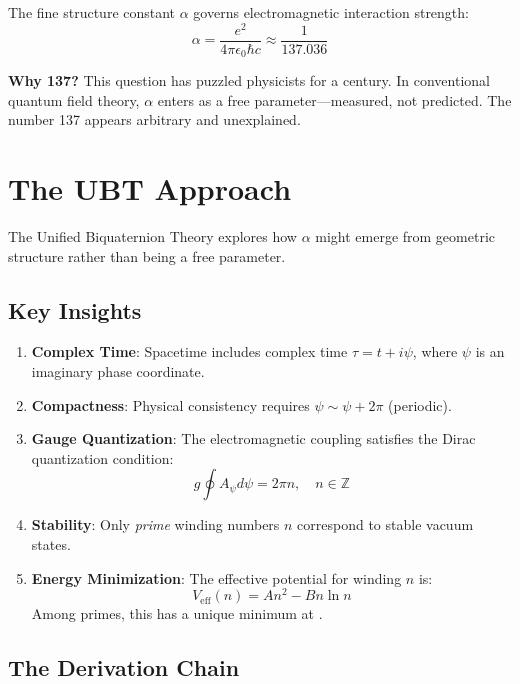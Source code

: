 \documentclass[12pt, a4paper]{article}
\begin{document}
The fine structure constant $\alpha$ governs electromagnetic interaction strength:
\begin{equation}
\alpha = \frac{e^2}{4\pi\epsilon_0\hbar c} \approx \frac{1}{137.036}
\end{equation}

\textbf{Why 137?} This question has puzzled physicists for a century. In conventional quantum field theory, $\alpha$ enters as a free parameter—measured, not predicted. The number 137 appears arbitrary and unexplained.

\section{The UBT Approach}

The Unified Biquaternion Theory explores how $\alpha$ might emerge from geometric structure rather than being a free parameter.

\subsection{Key Insights}

\begin{enumerate}
\item \textbf{Complex Time}: Spacetime includes complex time $\tau = t + i\psi$, where $\psi$ is an imaginary phase coordinate.

\item \textbf{Compactness}: Physical consistency requires $\psi \sim \psi + 2\pi$ (periodic).

\item \textbf{Gauge Quantization}: The electromagnetic coupling satisfies the Dirac quantization condition:
\begin{equation}
g \oint A_\psi d\psi = 2\pi n, \quad n \in \mathbb{Z}
\end{equation}

\item \textbf{Stability}: Only \emph{prime} winding numbers $n$ correspond to stable vacuum states.

\item \textbf{Energy Minimization}: The effective potential for winding $n$ is:
\begin{equation}
V_{\text{eff}}(n) = An^2 - Bn\ln n
\end{equation}
Among primes, this has a unique minimum at .
\end{enumerate}

\subsection{The Derivation Chain}
\end{document}
